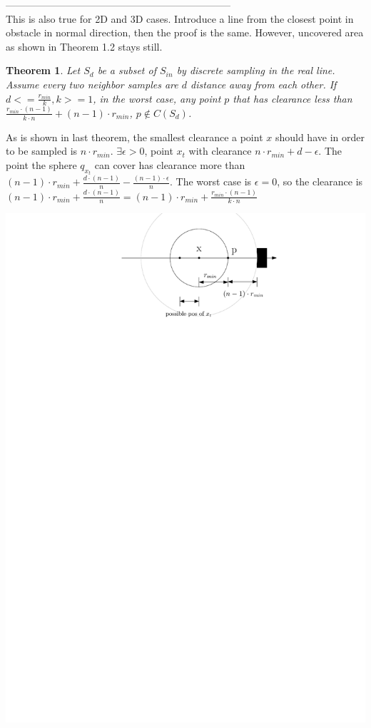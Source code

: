\documentclass[12pt]{article}
\newtheorem{theorem}{Theorem}[section]
\begin{document}
  --------------------------------------------------------------------\\
  
  This is also true for 2D and 3D cases. Introduce a line from the closest point in obstacle in normal direction, then the proof is the same. However, uncovered area as shown in Theorem 1.2 stays still.
  
  \begin{theorem}
  Let $S_{d}$ be a subset of $S_{in}$ by discrete sampling in the real line. Assume every two neighbor samples are $d$ distance away from each other. If $d <= \frac{r_{min}}{k}, k>=1$, in the worst case, any point $p$ that has clearance less than $\frac{r_{min} \cdot (n-1)}{k \cdot n} + (n-1) \cdot r_{min}$, $p \notin C(S_d)$.
  \end{theorem}
  
  As is shown in last theorem, the smallest clearance a point $x$ should have in order to be sampled is $n \cdot r_{min}$. $\exists \epsilon > 0$, point $x_{t}$ with clearance $n \cdot r_{min} + d - \epsilon$. The point the sphere $q_{x_{t}}$ can cover has clearance more than  $(n-1) \cdot r_{min} + \frac{d \cdot (n-1)}{n} - \frac{(n-1) \cdot \epsilon}{n}$. The worst case is $\epsilon = 0$, so the clearance is $(n-1) \cdot r_{min} + \frac{d \cdot (n-1)}{n} = (n-1) \cdot r_{min} + \frac{r_{min} \cdot (n-1)}{k \cdot n}$
    
  \includegraphics[scale=0.8]{sample_S_d}\\
  
\end{document}
